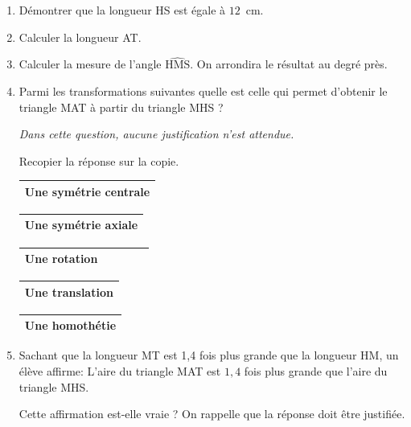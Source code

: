 \documentclass[11pt]{article}
\begin{document}
\smallskip

\begin{enumerate}
\item Démontrer que la longueur HS est égale à $12$~cm.
\item Calculer la longueur AT.
\item Calculer la mesure de l'angle $\widehat{\text{HMS}}$. On arrondira le résultat au degré près.
\item Parmi les transformations suivantes quelle est celle qui permet d'obtenir le triangle MAT à partir du triangle MHS ?

\emph{Dans cette question, aucune justification n'est attendue.}

Recopier la réponse sur la copie.


\begin{minipage}{2.35cm}
\begin{tabular}{|m{2.35cm}|}\hline
Une symétrie centrale\\ \hline
\end{tabular}
\end{minipage}\quad
\begin{minipage}{2.35cm}
\begin{tabular}{|m{2.35cm}|}\hline
Une symétrie axiale\\ \hline
\end{tabular}
\end{minipage}\quad
\begin{minipage}{2.15cm}
\begin{tabular}{|m{2.15cm}|}\hline
Une rotation~~~~~~~\\ \hline
\end{tabular}
\end{minipage}\quad
\begin{minipage}{2.35cm}
\begin{tabular}{|m{2.35cm}|}\hline
Une translation\\ \hline
\end{tabular}
\end{minipage}\quad
\begin{minipage}{2.35cm}
\begin{tabular}{|m{2.35cm}|}\hline
Une homothétie\\ \hline
\end{tabular}
\end{minipage}
 

\item Sachant que la longueur MT est 1,4 fois plus grande que la longueur HM, un élève affirme: \og L'aire du triangle MAT est $1,4$ fois plus grande que l'aire du triangle MHS. \fg{}

Cette affirmation est-elle vraie ? On rappelle que la réponse doit être justifiée.
\end{enumerate}
\end{document}

